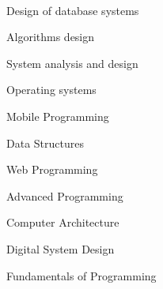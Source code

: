  ‌‌
  \\
  \begin{cvitems}
    \item {Design of database systems}
    \item {Algorithms design}
    \item {System analysis and design}
    \item {Operating systems}
    \item {Mobile Programming}
    \item {Data Structures}
    \item {Web Programming}
    \item {Advanced Programming}
    \item {Computer Architecture}
    \item {Digital System Design}
    \item {Fundamentals of Programming}
  \end{cvitems}


